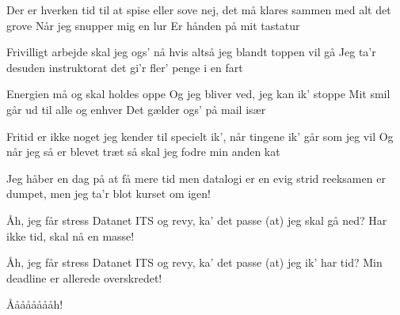 \documentclass[a4paper,11pt]{article}
\begin{document}
\begin{song}
Der er hverken tid til at spise eller sove
nej, det må klares sammen med alt det grove
Når jeg snupper mig en lur
Er hånden på mit tastatur

Frivilligt arbejde skal jeg ogs' nå
hvis altså jeg blandt toppen vil gå
Jeg ta'r desuden instruktorat
det gi'r fler' penge i en fart

Energien må og skal holdes oppe
Og jeg bliver ved, jeg kan ik' stoppe
Mit smil går ud til alle og enhver
Det gælder ogs' på mail især

Fritid er ikke noget jeg kender til
specielt ik', når tingene ik' går som jeg vil
Og når jeg så er blevet træt
så skal jeg fodre min anden kat

Jeg håber en dag på at få mere tid
men datalogi er en evig strid
reeksamen er dumpet, men
jeg ta'r blot kurset om igen!

Åh, jeg får stress
Datanet
ITS
og revy, ka' det passe
(at) jeg skal gå ned? Har ikke tid, skal nå en masse!

Åh, jeg får stress
Datanet
ITS
og revy, ka' det passe
(at) jeg ik' har tid? Min deadline er allerede overskredet!

Ååååååååh!

\end{song}
\end{document}
